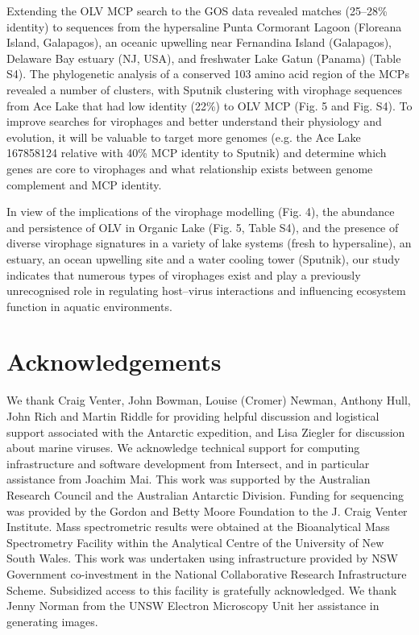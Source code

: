 Extending the \ac{OLV} \ac{MCP} search to the \ac{GOS} data revealed matches (25--28\% identity) to sequences from the hypersaline Punta Cormorant Lagoon (Floreana Island, Galapagos), an oceanic upwelling near Fernandina Island (Galapagos), Delaware Bay estuary (\textsc{NJ}, \textsc{USA}), and freshwater Lake Gatun (Panama) (Table S4). 
The phylogenetic analysis of a conserved 103 amino acid region of the \acp{MCP} revealed a number of clusters, with Sputnik clustering with virophage sequences from Ace Lake that had low identity (22\%) to \ac{OLV} \ac{MCP} (Fig. 5 and Fig. S4). 
To improve searches for virophages and better understand their physiology and evolution, it will be valuable to target more genomes (e.g. the Ace Lake 167858124 relative with 40\% MCP identity to Sputnik) and determine which genes are core to virophages and what relationship exists between genome complement and \ac{MCP} identity.
 
In view of the implications of the virophage modelling (Fig. 4), the abundance and persistence of \ac{OLV} in Organic Lake (Fig. 5, Table S4), and the presence of diverse virophage signatures in a variety of lake systems (fresh to hypersaline), an estuary, an ocean upwelling site and a water cooling tower (Sputnik), our study indicates that numerous types of virophages exist and play a previously unrecognised role in regulating host--virus interactions and influencing ecosystem function in aquatic environments. 


\section{Acknowledgements}
We thank Craig Venter, John Bowman, Louise (Cromer) Newman, Anthony Hull, John Rich and Martin Riddle for providing helpful discussion and logistical support associated with the Antarctic expedition, and Lisa Ziegler for discussion about marine viruses. 
We acknowledge technical support for computing infrastructure and software development from Intersect, and in particular assistance from Joachim Mai. 
This work was supported by the Australian Research Council and the Australian Antarctic Division. 
Funding for sequencing was provided by the Gordon and Betty Moore Foundation to the J. Craig Venter Institute. 
Mass spectrometric results were obtained at the Bioanalytical Mass Spectrometry Facility within the Analytical Centre of the University of New South Wales. 
This work was undertaken using infrastructure provided by NSW Government co-investment in the National Collaborative Research Infrastructure Scheme. 
Subsidized access to this facility is gratefully acknowledged. 
We thank Jenny Norman from the UNSW Electron Microscopy Unit her assistance in generating images. 
